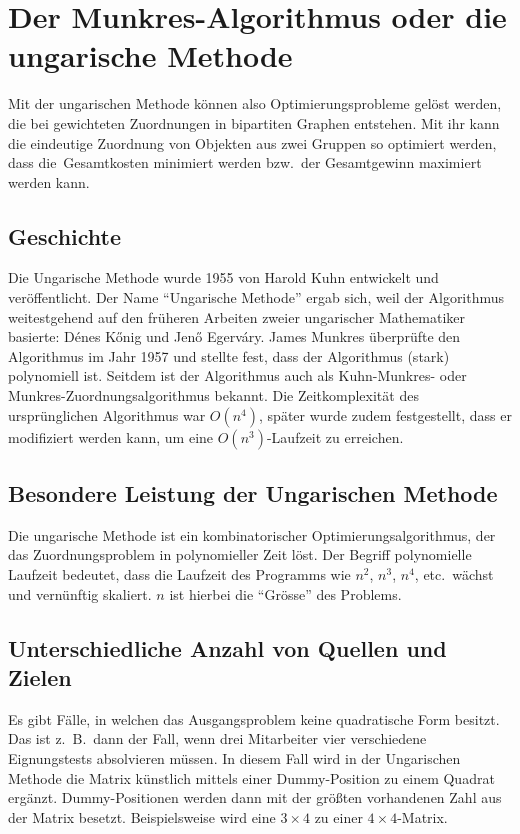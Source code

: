 %
%
%
\section{Der Munkres-Algorithmus oder die ungarische Methode
\label{munkres:section:teil3}}

Mit der ungarischen Methode können also Optimierungsprobleme gelöst
werden, die bei gewichteten Zuordnungen in bipartiten Graphen entstehen.
Mit ihr kann die eindeutige Zuordnung von Objekten aus zwei Gruppen so
optimiert werden, dass die Gesamtkosten minimiert werden bzw.~der
Gesamtgewinn maximiert werden kann.


\subsection{Geschichte
\label{munkres:subsection:malorum}}
Die Ungarische Methode wurde 1955 von Harold Kuhn entwickelt und veröffentlicht.
%
Der Name ``Ungarische Methode'' ergab sich, weil der Algorithmus
weitestgehend auf den früheren Arbeiten zweier ungarischer Mathematiker
basierte: Dénes Kőnig und Jenő Egerváry.
%
%
%
James Munkres überprüfte den Algorithmus im Jahr 1957 und stellte fest,
dass der Algorithmus (stark) polynomiell ist.
Seitdem ist der Algorithmus auch als Kuhn-Munkres- oder
Munkres-Zuordnungsalgorithmus bekannt.
%
%
Die Zeitkomplexität des ursprünglichen Algorithmus war $O(n^4)$,
später wurde zudem festgestellt, dass er modifiziert werden kann,
um eine  $O(n^3)$-Laufzeit zu erreichen.

\subsection{Besondere Leistung der Ungarischen Methode
\label{munkres:subsection:malorum}}
Die ungarische Methode ist ein kombinatorischer Optimierungsalgorithmus, der das Zuordnungsproblem
%
in polynomieller Zeit löst.
Der Begriff polynomielle Laufzeit bedeutet, dass die Laufzeit des Programms
%
wie $n^2$, $n^3$, $n^4$, etc.~wächst und vernünftig skaliert. $n$ ist hierbei die ``Grösse'' des Problems.

\subsection{Unterschiedliche Anzahl von Quellen und Zielen
\label{munkres:subsection:malorum}}
Es gibt Fälle, in welchen das Ausgangsproblem keine quadratische Form besitzt.
Das ist z.~B.~dann der Fall, wenn drei Mitarbeiter vier verschiedene Eignungstests absolvieren müssen.
In diesem Fall wird in der Ungarischen Methode die Matrix künstlich mittels einer Dummy-Position zu einem Quadrat ergänzt.
Dummy-Positionen werden dann mit der größten vorhandenen Zahl aus der Matrix besetzt.
Beispielsweise wird eine $3\times 4$ zu einer $4\times 4$-Matrix.

